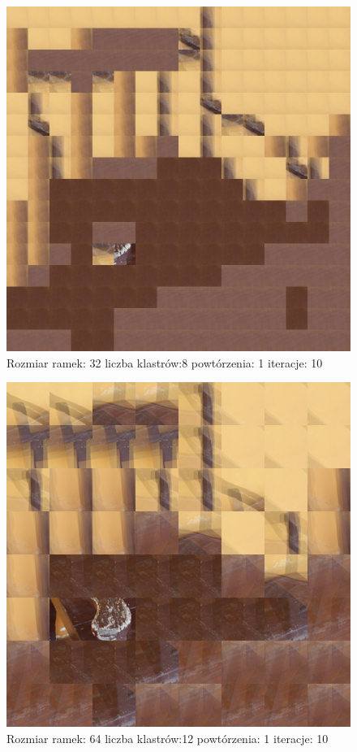 \documentclass{classrep}
\begin{document}
{{{{                    \begin{figure}[!htbp]
                        \centering
                        \includegraphics[width=\textwidth,width=90mm]{obrazy/chair_R32_K8_P1_It10.png}
                        \caption{Rozmiar ramek: 32 liczba klastrów:8 powtórzenia: 1 iteracje: 10 }
                    \end{figure}

                    \begin{figure}[!htbp]
                        \centering
                        \includegraphics[width=\textwidth,width=90mm]{obrazy/chair_R64_K12_P1_It10.png}
                        \caption{Rozmiar ramek: 64 liczba klastrów:12 powtórzenia: 1 iteracje: 10 }
                    \end{figure}
                    \FloatBarrier
                }

}}}
\end{document}
